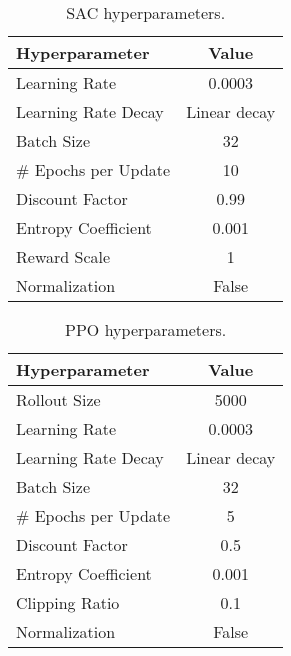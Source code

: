 \begin{table}[ht]
    \caption{SAC hyperparameters.}
    \label{tab:sac_hyperparameter}
    \centering
    \begin{tabular}{lc}
        \toprule
        Hyperparameter & Value \\
        \midrule
        Learning Rate & 0.0003 \\
        Learning Rate Decay & Linear decay \\
        Batch Size & 32 \\
        \# Epochs per Update & 10 \\
        Discount Factor & 0.99 \\
        Entropy Coefficient & 0.001 \\
        Reward Scale & 1  \\
        Normalization & False \\
        \bottomrule
    \end{tabular}
\end{table}

\begin{table}[ht]
    \caption{PPO hyperparameters.}
    \label{tab:ppo_hyperparameter}
    \centering
    \begin{tabular}{lc}
        \toprule
        Hyperparameter & Value \\
        \midrule
        Rollout Size & 5000 \\
        Learning Rate & 0.0003 \\
        Learning Rate Decay & Linear decay \\
        Batch Size & 32 \\
        \# Epochs per Update & 5 \\
        Discount Factor & 0.5 \\
        Entropy Coefficient & 0.001 \\
        Clipping Ratio & 0.1  \\
        Normalization & False  \\
        \bottomrule
    \end{tabular}
\end{table}

